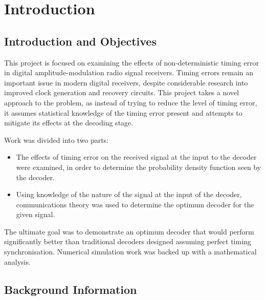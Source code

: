 
\part{Introduction}

\chapter{Introduction and Objectives}

This project is focused on examining the effects of non-deterministic timing error in digital amplitude-modulation radio signal receivers. Timing errors remain an important issue in modern digital receivers, despite considerable research into improved clock generation and recovery circuits. This project takes a novel approach to the problem, as instead of trying to reduce the level of timing error, it assumes statistical knowledge of the timing error present and attempts to mitigate its effects at the decoding stage.

Work was divided into two parts:

\begin{itemize}
\item
The effects of timing error on the received signal at the input to the decoder were examined, in order to determine the probability density function seen by the decoder.
\item
Using knowledge of the nature of the signal at the input of the decoder, communications theory was used to determine the optimum decoder for the given signal.
\end{itemize}

The ultimate goal was to demonstrate an optimum decoder that would perform significantly better than traditional decoders designed assuming perfect timing synchronisation. Numerical simulation work was backed up with a mathematical analysis.

\chapter{Background Information}

